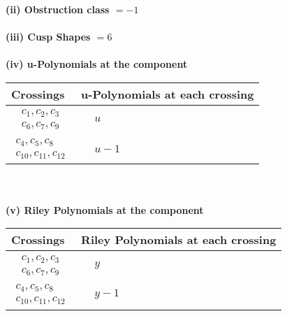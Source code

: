 \documentclass[1p]{elsarticle_modified}
\theoremstyle{definition}
\begin{document}
\flushleft \textbf{(ii) Obstruction class $= -1$}\\~\\
\flushleft \textbf{(iii) Cusp Shapes $= 6$}\\~\\
\newpage\renewcommand{\arraystretch}{1}
\flushleft \textbf{(iv) u-Polynomials at the component}\newline \\
\begin{tabular}{m{50pt}|m{274pt}}
Crossings & \hspace{64pt}u-Polynomials at each crossing \\
\hline $$\begin{aligned}c_{1},c_{2},c_{3}\\c_{6},c_{7},c_{9}\end{aligned}$$&$\begin{aligned}
&u
\end{aligned}$\\
\hline $$\begin{aligned}c_{4},c_{5},c_{8}\\c_{10},c_{11},c_{12}\end{aligned}$$&$\begin{aligned}
&u-1
\end{aligned}$\\
\hline
\end{tabular}\\~\\
\newpage\renewcommand{\arraystretch}{1}
\flushleft \textbf{(v) Riley Polynomials at the component}\newline \\
\begin{tabular}{m{50pt}|m{274pt}}
Crossings & \hspace{64pt}Riley Polynomials at each crossing \\
\hline $$\begin{aligned}c_{1},c_{2},c_{3}\\c_{6},c_{7},c_{9}\end{aligned}$$&$\begin{aligned}
&y
\end{aligned}$\\
\hline $$\begin{aligned}c_{4},c_{5},c_{8}\\c_{10},c_{11},c_{12}\end{aligned}$$&$\begin{aligned}
&y-1
\end{aligned}$\\
\hline
\end{tabular}\\~\\
\end{document}

